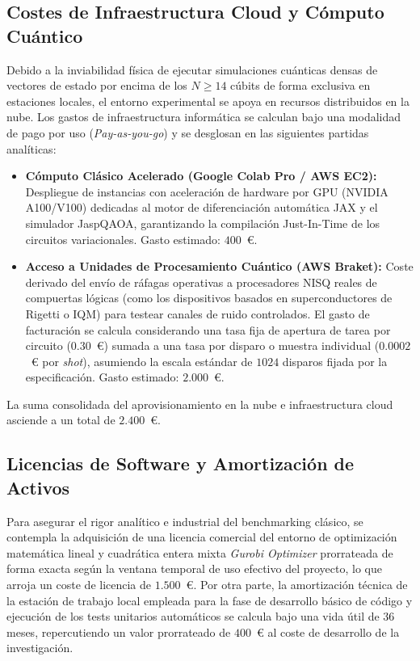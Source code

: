 \subsection{Costes de Infraestructura Cloud y Cómputo Cuántico}
Debido a la inviabilidad física de ejecutar simulaciones cuánticas densas de vectores de estado por encima de los $N \ge 14$ cúbits de forma exclusiva en estaciones locales, el entorno experimental se apoya en recursos distribuidos en la nube. Los gastos de infraestructura informática se calculan bajo una modalidad de pago por uso (\textit{Pay-as-you-go}) y se desglosan en las siguientes partidas analíticas:
\begin{itemize}
    \item \textbf{Cómputo Clásico Acelerado (Google Colab Pro / AWS EC2):} Despliegue de instancias con aceleración de hardware por GPU (NVIDIA A100/V100) dedicadas al motor de diferenciación automática JAX y el simulador JaspQAOA, garantizando la compilación Just-In-Time de los circuitos variacionales. Gasto estimado: $400$~\euro{}.
    \item \textbf{Acceso a Unidades de Procesamiento Cuántico (AWS Braket):} Coste derivado del envío de ráfagas operativas a procesadores NISQ reales de compuertas lógicas (como los dispositivos basados en superconductores de Rigetti o IQM) para testear canales de ruido controlados. El gasto de facturación se calcula considerando una tasa fija de apertura de tarea por circuito ($0.30$~\euro{}) sumada a una tasa por disparo o muestra individual ($0.0002$~\euro{} por \textit{shot}), asumiendo la escala estándar de $1024$ disparos fijada por la especificación. Gasto estimado: $2.000$~\euro{}.
\end{itemize}

La suma consolidada del aprovisionamiento en la nube e infraestructura cloud asciende a un total de $2.400$~\euro{}.

\subsection{Licencias de Software y Amortización de Activos}
Para asegurar el rigor analítico e industrial del benchmarking clásico, se contempla la adquisición de una licencia comercial del entorno de optimización matemática lineal y cuadrática entera mixta \textit{Gurobi Optimizer} prorrateada de forma exacta según la ventana temporal de uso efectivo del proyecto, lo que arroja un coste de licencia de $1.500$~\euro{}. Por otra parte, la amortización técnica de la estación de trabajo local empleada para la fase de desarrollo básico de código y ejecución de los tests unitarios automáticos se calcula bajo una vida útil de 36 meses, repercutiendo un valor prorrateado de $400$~\euro{} al coste de desarrollo de la investigación.

